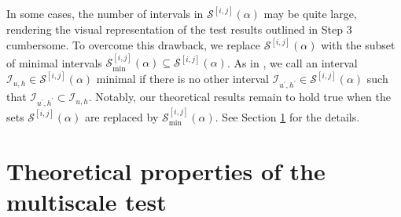 \documentclass[12pt]{article}
\begin{document}
\begin{remark} 
In some cases, the number of intervals in $\mathcal{S}^{[i, j]}(\alpha)$ may be quite large, rendering the visual representation of the test results outlined in Step 3 cumbersome. To overcome this drawback, we replace $\mathcal{S}^{[i, j]}(\alpha)$ with the subset of minimal intervals $\mathcal{S}^{[i, j]}_{\text{min}}(\alpha) \subseteq \mathcal{S}^{[i, j]}(\alpha)$. As in \cite{Duembgen2002}, we call an interval $\mathcal{I}_{u, h} \in \mathcal{S}^{[i, j]}(\alpha)$ minimal if there is no other interval $\mathcal{I}_{u^\prime, h^\prime} \in \mathcal{S}^{[i, j]}(\alpha)$ such that $\mathcal{I}_{u^\prime, h^\prime} \subset \mathcal{I}_{u, h}$. Notably, our theoretical results remain to hold true when the sets $\mathcal{S}^{[i, j]}(\alpha)$ are replaced by $\mathcal{S}^{[i, j]}_{\text{min}}(\alpha)$. See Section \ref{sec:theo} for the details. 
\end{remark}



\section{Theoretical properties of the multiscale test}\label{sec:theo}
\end{document}
